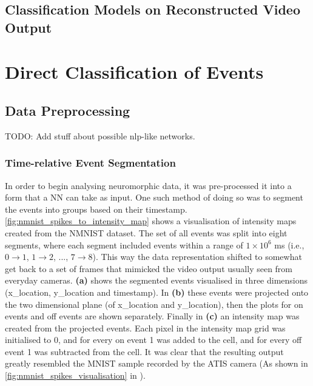 \color{black}

\subsection{Classification Models on Reconstructed Video Output}

\section{Direct Classification of Events}

\subsection{Data Preprocessing}

\color{red} TODO: Add stuff about possible nlp-like networks. \color{black}

\subsubsection{Time-relative Event Segmentation}
In order to begin analysing neuromorphic data, it was pre-processed it into a form that a NN can take as input. One such method of doing so was to segment the events into groups based on their timestamp. \autoref{fig:nmnist_spikes_to_intensity_map} shows a visualisation of intensity maps created from the NMNIST\cite{NMNIST} dataset. The set of all events was split into eight segments, where each segment included events within a range of $ 1 \times 10^6 $ ms (i.e., $ 0 \rightarrow 1 $, $ 1 \rightarrow 2 $, ..., $ 7 \rightarrow 8 $). This way the data representation shifted to somewhat get back to a set of frames that mimicked the video output usually seen from everyday cameras. \textbf{(a)} shows the segmented events visualised in three dimensions (x\_location, y\_location and timestamp). In \textbf{(b)} these events were projected onto the two dimensional plane (of x\_location and y\_location), then the plots for on events and off events are shown separately. Finally in \textbf{(c)} an intensity map was created from the projected events. Each pixel in the intensity map grid was initialised to 0, and for every on event 1 was added to the cell, and for every off event 1 was subtracted from the cell. It was clear that the resulting output greatly resembled the MNIST\cite{MNIST} sample recorded by the ATIS camera (As shown in \autoref{fig:nmnist_spikes_visualisation} in ).

